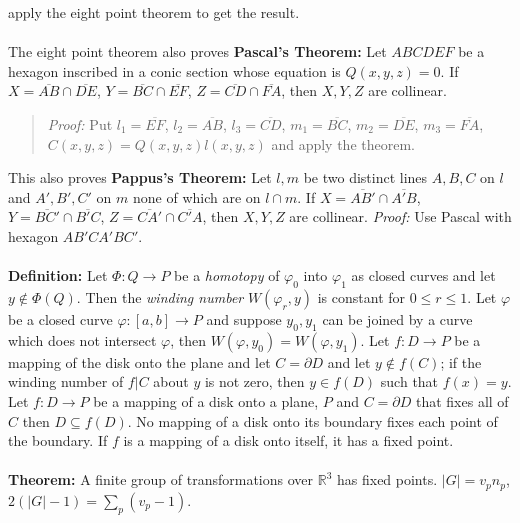 apply the eight point theorem to get the result.
\\
\\
The eight point theorem also proves {\bf Pascal's Theorem:}
Let $ABCDEF$ be a hexagon inscribed in a
conic section whose equation is $Q(x,y,z)=0$.  If 
$X= {\overline {AB}} \cap  {\overline {DE}}$,
$Y= {\overline {BC}} \cap  {\overline {EF}}$,
$Z= {\overline {CD}} \cap  {\overline {FA}}$, then $X, Y, Z$ are collinear.  
\begin{quote}
\emph{Proof:}
Put
$l_1 = {\overline {EF}}$,
$l_2 = {\overline {AB}}$,
$l_3 = {\overline {CD}}$,
$m_1 = {\overline {BC}}$,
$m_2 = {\overline {DE}}$,
$m_3 = {\overline {FA}}$, $C(x,y,z)= Q(x,y,z)l(x,y,z)$ and apply the theorem. 
\end{quote}
This also proves {\bf Pappus's Theorem:} Let $l, m$ be two distinct lines $A,B,C$ on $l$ and
$A', B', C'$ on $m$ none of which are on $l \cap m$.  If
$X= {\overline {AB'}} \cap  {\overline {A' B}}$,
$Y= {\overline {BC'}} \cap  {\overline {B'C}}$,
$Z= {\overline {CA'}} \cap  {\overline {C'A}}$, then $X, Y, Z$ are collinear.  \emph{Proof:}
Use Pascal with hexagon $AB'CA'BC'$.
\\
\\
{\bf Definition:}
Let $\Phi: Q \rightarrow P$ be a \emph{homotopy} of $\varphi_0$ into $\varphi_1$ as closed
curves and let $y \notin \Phi(Q)$.  Then the \emph{winding number}
$W(\varphi_r, y)$ is constant
for $0 \le r \le 1$.  Let $\varphi$ be a closed curve $\varphi: [a,b] \rightarrow P$ and
suppose $y_0 , y_1$ can be joined by a curve which does not intersect $\varphi$, then
$W(\varphi, y_0 )= W(\varphi , y_1)$.  Let $f: D \rightarrow P$ be a mapping of
the disk onto the plane and let $C= \partial D$ and let $y \notin f(C)$;
if the winding number
of $f|C$ about $y$ is not zero, then $y \in f(D)$ such that $f(x)=y$.
Let $f: D \rightarrow P$ be a mapping of a disk onto a plane, $P$ and $C= \partial D$
that fixes all of $C$ then $D \subseteq f(D)$.  No mapping of a disk onto its boundary
fixes each point of the boundary.  If $f$ is a mapping of a disk onto itself, it has
a fixed point. 
\\
\\
{\bf Theorem:}
A finite group of transformations over ${\mathbb R}^3$ has fixed points. $|G|= v_p n_p$,
$2(|G| -1) = \sum_p (v_p - 1)$.
